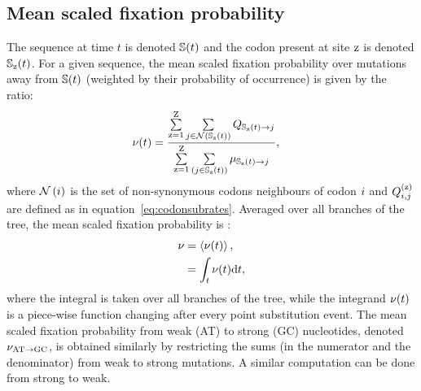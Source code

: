 \subsection{Mean scaled fixation probability}
\label{subsec:fixation-bias}
The sequence at time $t$ is denoted $\mathbb{S}(t)$ and the codon present at site $\text{z}$ is denoted $\mathbb{S}_{\text{z}}(t)$.
For a given sequence, the mean scaled fixation probability over mutations away from $\mathbb{S}(t)$ (weighted by their probability of occurrence) is given by the ratio:
\begin{align}
    \nu (t) & = \dfrac{ \sum\limits_{\text{z}=1}^{\text{Z}} \sum\limits_{{j} \in \mathcal{N} \left ( \mathbb{S}_{\text{z}}(t) \right)} Q_{\mathbb{S}_{\text{z}}(t) \to {j}}}{ \sum\limits_{\text{z}=1}^{\text{Z}} \sum\limits_{\left ( {j} \in \mathbb{S}_{\text{z}}(t) \right)} \mu_{\mathbb{S}_{\text{z}}(t) \to {j}}},
\end{align}
where $\mathcal{N}\left({i}\right)$ is the set of non-synonymous codons neighbours of codon ${i}$ and $Q_{{i}, {j}}^{(\text{z})}$ are defined as in equation~\ref{eq:codonsubrates}.
Averaged over all branches of the tree, the mean scaled fixation probability is :
\begin{align}
    \nu & = \left\langle \nu (t) \right\rangle, \\
    & = \int_{t} \nu (t) \text{d} t,
\end{align}
where the integral is taken over all branches of the tree, while the integrand $\nu (t)$ is a piece-wise function changing after every point substitution event.
The mean scaled fixation probability from weak (AT) to strong (GC) nucleotides, denoted $\nu_{\text{AT} \rightarrow \text{GC}}$, is obtained similarly by restricting the sums (in the numerator and the denominator) from weak to strong mutations.
A similar computation can be done from strong to weak.

